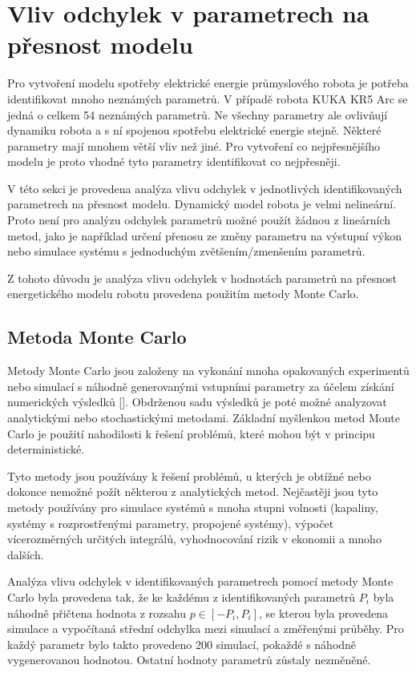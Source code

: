 \chapter{Vliv odchylek v parametrech na přesnost modelu}

Pro vytvoření modelu spotřeby elektrické energie průmyslového robota je potřeba identifikovat mnoho neznámých parametrů. V případě robota KUKA KR5 Arc se jedná o celkem 54 neznámých parametrů. Ne všechny parametry ale ovlivňují dynamiku robota a s ní spojenou spotřebu elektrické energie stejně. Některé parametry mají mnohem větší vliv než jiné. Pro vytvoření co nejpřesnějšího modelu je proto vhodné tyto parametry identifikovat co nejpřesněji. 

V této sekci je provedena analýza vlivu odchylek v jednotlivých identifikovaných parametrech na přesnost modelu. Dynamický model robota je velmi nelineární. Proto není pro analýzu odchylek parametrů možné použít žádnou z lineárních metod, jako je například určení přenosu ze změny parametru na výstupní výkon nebo simulace systému s jednoduchým zvětšením/zmenšením parametrů. 

Z tohoto důvodu je analýza vlivu odchylek v hodnotách parametrů na přesnost energetického modelu robotu provedena použitím metody Monte Carlo. 

\section{Metoda Monte Carlo}

Metody Monte Carlo jsou založeny na vykonání mnoha opakovaných experimentů nebo simulací s náhodně generovanými vstupními parametry za účelem získání numerických výsledků [\cite{monte_carlo_ref}]. Obdrženou sadu výsledků je poté možné analyzovat analytickými nebo stochastickými metodami. Základní myšlenkou metod Monte Carlo je použití nahodilosti k řešení problémů, které mohou být v principu deterministické.

Tyto metody jsou používány k řešení problémů, u kterých je obtížné nebo dokonce nemožné požít některou z analytických metod. Nejčastěji jsou tyto metody používány pro simulace systémů s mnoha stupni volnosti (kapaliny, systémy s rozprostřenými parametry, propojené systémy), výpočet vícerozměrných určitých integrálů, vyhodnocování rizik v ekonomii a mnoho dalších. 

Analýza vlivu odchylek v identifikovaných parametrech pomocí metody Monte Carlo byla provedena tak, že ke každému z identifikovaných parametrů $P_i$ byla náhodně přičtena hodnota z rozsahu $p \in [-P_i,P_i]$, se kterou byla provedena simulace a vypočítaná střední odchylka mezi simulací a změřenými průběhy. Pro každý parametr bylo takto provedeno 200 simulací, pokaždé s náhodně vygenerovanou hodnotou. Ostatní hodnoty parametrů zůstaly nezměněné. 

